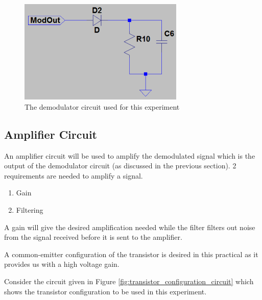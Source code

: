 \documentclass[12pt, a4paper]{article}
\begin{document}
		\begin{figure}[H]
			\centering
			\includegraphics[width=0.7\textwidth]{images/Demodulator_circuit.png}
			\caption{The demodulator circuit used for this experiment}
			\label{fig:demodulator_circuit}
		\end{figure}

	\subsection{Amplifier Circuit} %
	\label{sub:amplifier_circuit}
	 An amplifier circuit will be used to amplify the demodulated signal which is the output of the demodulator circuit (as discussed in the previous section). 2 requirements are needed to amplify a signal.
	 \begin{enumerate}
	 	\item Gain
	 	\item Filtering
	 \end{enumerate}

	 A gain will give the desired amplification needed while the filter filters out noise from the signal received before it is sent to the amplifier.

	 A common-emitter configuration of the transistor is desired in this practical as it provides us with a high voltage gain. 

	 Consider the circuit given in Figure \ref{fig:transistor_configuration_circuit} which shows the transistor configuration to be used in this experiment.
\end{document}
